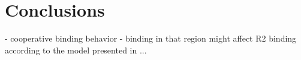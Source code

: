 \chapter{Conclusions}


- cooperative binding behavior
- binding in that region might affect R2 binding according to the model
    presented in ...